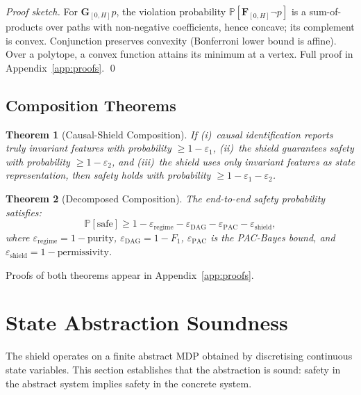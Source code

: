 \documentclass[11pt]{article}
\newtheorem{theorem}{Theorem}
\newcommand{\Prob}{\mathbb{P}}
\begin{document}
\noindent\emph{Proof sketch.}
For $\mathbf{G}_{[0,H]} p$, the violation probability
$\Prob[\mathbf{F}_{[0,H]} \neg p]$ is a sum-of-products over paths
with non-negative coefficients, hence concave; its complement is
convex.  Conjunction preserves convexity (Bonferroni lower bound is
affine).  Over a polytope, a convex function attains its minimum at a
vertex.  Full proof in Appendix~\ref{app:proofs}. \qed

\subsection{Composition Theorems}

\begin{theorem}[Causal-Shield Composition]\label{thm:composition}
If (i)~causal identification reports truly invariant features with
probability $\geq 1 - \varepsilon_1$, (ii)~the shield guarantees
safety with probability $\geq 1 - \varepsilon_2$, and (iii)~the
shield uses only invariant features as state representation, then
safety holds with probability $\geq 1 - \varepsilon_1 - \varepsilon_2$.
\end{theorem}

\begin{theorem}[Decomposed Composition]\label{thm:decomposed}
The end-to-end safety probability satisfies:
\begin{equation}\label{eq:decomposed}
  \Prob[\text{safe}] \geq 1 -
    \varepsilon_{\mathrm{regime}} -
    \varepsilon_{\mathrm{DAG}} -
    \varepsilon_{\mathrm{PAC}} -
    \varepsilon_{\mathrm{shield}},
\end{equation}
where $\varepsilon_{\mathrm{regime}} = 1 - \text{purity}$,
$\varepsilon_{\mathrm{DAG}} = 1 - F_1$,
$\varepsilon_{\mathrm{PAC}}$ is the PAC-Bayes bound, and
$\varepsilon_{\mathrm{shield}} = 1 - \text{permissivity}$.
\end{theorem}

Proofs of both theorems appear in Appendix~\ref{app:proofs}.


\section{State Abstraction Soundness}\label{sec:abstraction}

The shield operates on a finite abstract MDP obtained by discretising
continuous state variables.  This section establishes that the
abstraction is sound: safety in the abstract system implies safety in
the concrete system.
\end{document}
